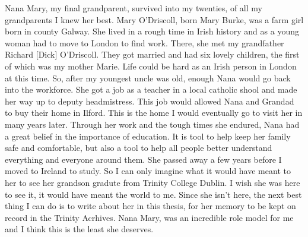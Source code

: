 \documentclass[a4paper,oneside,12pt]{book}
\numberwithin{equation}{chapter} %
\begin{document}
Nana Mary, my final grandparent, survived into my twenties, of all my grandparents I knew her best. Mary O'Driscoll, born Mary Burke, was a farm girl born in county Galway. She lived in a rough time in Irish history and as a young woman had to move to London to find work. There, she met my grandfather Richard [Dick] O'Driscoll. They got married and had six lovely children, the first of which was my mother Marie. Life could be hard as an Irish person in London at this time. So, after my youngest uncle was old, enough Nana would go back into the workforce. She got a job as a teacher in a local catholic shool and made her way up to deputy headmistress. This job would allowed Nana and Grandad to buy their home in Ilford. This is the home I would eventually go to visit her in many years later. Through her work and the tough times she endured, Nana had a great belief in the importance of education. It is tool to help keep her family safe and comfortable, but also a tool to help all people better understand everything and everyone around them. She passed away a few years before I moved to Ireland to study. So I can only imagine what it would have meant to her to see her grandson gradute from Trinity College Dublin. I wish she was here to see it, it would have meant the world to me. Since she isn't here, the next best thing I can do is to write about her in this thesis, for her memory to be kept on record in the Trinity Acrhives. Nana Mary, was an incredible role model for me and I think this is the least she deserves.

\end{document}
